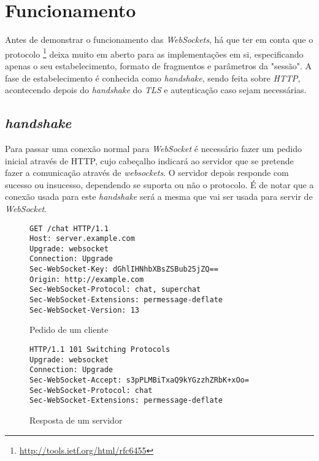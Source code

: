 \documentclass[a4paper]{article}
\begin{document}
\section{Funcionamento}

Antes de demonstrar o funcionamento das \emph{WebSockets}, há que ter em conta que o protocolo \footnote{\url{http://tools.ietf.org/html/rfc6455}} deixa muito em aberto para as implementações em si, especificando apenas o seu estabelecimento, formato de fragmentos e parâmetros da "sessão". A fase de estabelecimento é conhecida como \emph{handshake}, sendo feita sobre \emph{HTTP}, acontecendo depois do \emph{handshake} do \emph{TLS} e autenticação caso sejam necessárias.

\subsection{\emph{handshake}}

Para passar uma conexão normal para \emph{WebSocket} é necessário fazer um pedido inicial através de HTTP, cujo cabeçalho indicará ao servidor que se pretende fazer a comunicação através de \emph{websockets}. O servidor depois responde com sucesso ou insucesso, dependendo se suporta ou não o protocolo. É de notar que a conexão usada para este \emph{handshake} será a mesma que vai ser usada para servir de \emph{WebSocket}. 

\begin{figure}[H]
	\begin{framed}
		\texttt{\small GET /chat HTTP/1.1 \\
						Host: server.example.com \\
						Upgrade: websocket\\
						Connection: Upgrade\\
						Sec-WebSocket-Key: dGhlIHNhbXBsZSBub25jZQ==\\
						Origin: http://example.com\\
						Sec-WebSocket-Protocol: chat, superchat\\
						Sec-WebSocket-Extensions: permessage-deflate\\
						Sec-WebSocket-Version: 13\\
		}		
	\end{framed}
	\caption{Pedido de um cliente}
  \label{fig:httpHeaderReq}
\end{figure}

\begin{figure}[H]
	\begin{framed}
		\texttt{\small HTTP/1.1 101 Switching Protocols\\
					Upgrade: websocket\\
					Connection: Upgrade\\
					Sec-WebSocket-Accept: s3pPLMBiTxaQ9kYGzzhZRbK+xOo=\\
					Sec-WebSocket-Protocol: chat\\
					Sec-WebSocket-Extensions: permessage-deflate\\
		}
	\end{framed}
		\caption{Resposta de um servidor}
  \label{fig:httpHeaderRspS}
\end{figure}
\end{document}
